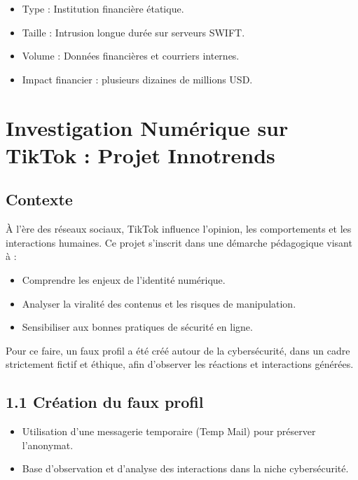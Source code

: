 \documentclass[12pt]{article}
\begin{document}
\begin{center}
\begin{itemize}[leftmargin=*, label=\textbullet]
    \item Type : Institution financière étatique.
    \item Taille : Intrusion longue durée sur serveurs SWIFT.
    \item Volume : Données financières et courriers internes.
    \item Impact financier : plusieurs dizaines de millions USD.

\end{itemize}

\section{Investigation Numérique sur TikTok : Projet Innotrends}

\subsection*{Contexte}
À l’ère des réseaux sociaux, TikTok influence l’opinion, les comportements et les interactions humaines. Ce projet s’inscrit dans une démarche pédagogique visant à :  
\begin{itemize}[leftmargin=*, label=\textbullet]
    \item Comprendre les enjeux de l’identité numérique.  
    \item Analyser la viralité des contenus et les risques de manipulation.  
    \item Sensibiliser aux bonnes pratiques de sécurité en ligne.
\end{itemize}

Pour ce faire, un faux profil a été créé autour de la cybersécurité, dans un cadre strictement fictif et éthique, afin d’observer les réactions et interactions générées.


\subsection{1.1 Création du faux profil}
\begin{itemize}[leftmargin=*, label=\textbullet]
    \item Utilisation d’une messagerie temporaire (Temp Mail) pour préserver l’anonymat.  
    \item Base d’observation et d’analyse des interactions dans la niche cybersécurité.
\end{itemize}



\end{center}
\end{document}
